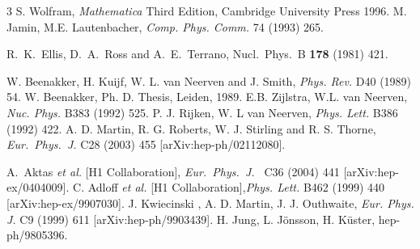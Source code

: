 \documentclass[superscriptaddress,showkeys,showpacs]{revtex4}
\begin{document}
\begin{thebibliography}{3}
 S. Wolfram, {\em Mathematica} Third Edition, 
Cambridge University Press 1996.  
 M. Jamin, M.E. Lautenbacher, {\em Comp. Phys. Comm.} 74 
(1993) 265.

R.~K.~Ellis, D.~A.~Ross and A.~E.~Terrano,
Nucl.\ Phys.\ B {\bf 178} (1981) 421.

 W. Beenakker, H. Kuijf, W. L. van Neerven and J. Smith, {\em Phys. Rev.} 
D40 (1989) 54. W. Beenakker, Ph. D. Thesis, Leiden, 1989. 
 E.B. Zijlstra, W.L. van Neerven, {\em Nuc. Phys.} B383  (1992) 525.
 P. J. Rijken, W. L  van Neerven, {\em Phys. Lett.} B386 
(1992) 422.
 A. D. Martin, R. G. Roberts, W. J. Stirling and R. S. Thorne,
{\em Eur.\ Phys.\ J.} {C28} (2003) 455 [arXiv:hep-ph/02112080].
 
A.~Aktas {\it et al.}  [H1 Collaboration],
{\em Eur.\ Phys.\ J.\ } {C36} (2004) 441
[arXiv:hep-ex/0404009].
 C. Adloff  {\it et al.}  [H1 Collaboration],{\em Phys. Lett.} B462 (1999) 440 [arXiv:hep-ex/9907030].
 J. Kwiecinski , A. D. Martin, J. J. Outhwaite,  {\em Eur. Phys. J.} C9 (1999) 611 [arXiv:hep-ph/9903439]. 
 H. Jung, L. J\"onsson, H. K\"uster, hep-ph/9805396.
\end{thebibliography}
\end{document}
